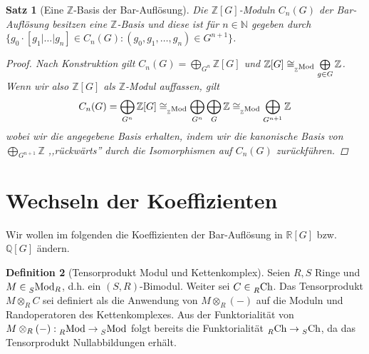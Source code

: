 \documentclass[a4paper,twoside,10pt]{scrreprt}
\newcommand{\Z}{\mathbb{Z}}
\newcommand{\N}{\mathbb{N}}
\newcommand{\Q}{\mathbb{Q}}
\newcommand{\R}{\mathbb{R}}
\newtheorem{satz}{Satz}[section]
\theoremstyle{definition}
\newtheorem{definition}[satz]{Definition}
\begin{document}
\begin{satz}[Eine $\Z$-Basis der Bar-Auflösung]\label{satz:ZBasisOfBarRes}
Die $\Z [G]$-Moduln $C_n(G)$ der Bar-Auflösung besitzen eine $\Z$-Basis und diese ist für $n\in \N$ gegeben durch $\{g_0\cdot [g_1|\ldots|g_n]\in C_n(G):(g_0,g_1,\ldots,g_n)\in G^{n+1}\}$.
\begin{proof}
Nach Konstruktion gilt $C_n(G)=\bigoplus\limits_{G^n} \Z[G]$ und $\Z[G]\cong_{\prescript{}{\Z}{\text{Mod}}}\bigoplus\limits_{g\in G} \Z$. Wenn wir also $\Z[G]$ als $\Z$-Modul auffassen, gilt 
\begin{equation*}
C_n(G)=\bigoplus\limits_{G^n} \Z[G]\cong_{\prescript{}{\Z}{\text{Mod}}}\bigoplus\limits_{G^n}\bigoplus\limits_G \Z\cong_{\prescript{}{\Z}{\text{Mod}}}\bigoplus\limits_{G^{n+1}} \Z
\end{equation*}
wobei wir die angegebene Basis erhalten, indem wir die kanonische Basis von $\bigoplus\limits_{G^{n+1}} \Z$ ,,rückwärts'' durch die Isomorphismen auf $C_n(G)$ zurückführen.
\end{proof}
\end{satz}

\section{Wechseln der Koeffizienten}
Wir wollen im folgenden die Koeffizienten der Bar-Auflösung in $\R[G]$ bzw. $\Q[G]$ ändern. 
\begin{definition}[Tensorprodukt Modul und Kettenkomplex]\label{def:TensorModCh}
Seien $R,S$ Ringe und $M\in \prescript{}{S}{\text{Mod}}_R$, d.h. ein $(S,R)$-Bimodul. Weiter sei $C\in \prescript{}{R}{\text{Ch}}$.
Das Tensorprodukt $M\otimes_{R}C$ sei definiert als die Anwendung von $M\otimes_{R}(-)$ auf die Moduln und Randoperatoren des Kettenkomplexes. Aus der Funktorialität von $M\otimes_{R}(-):\prescript{}{R}{\text{Mod}}\to \prescript{}{S}{\text{Mod}}$ folgt bereits die Funktorialität $\prescript{}{R}{\text{Ch}}\to \prescript{}{S}{\text{Ch}}$, da das Tensorprodukt Nullabbildungen erhält.
\end{definition}
\end{document}
